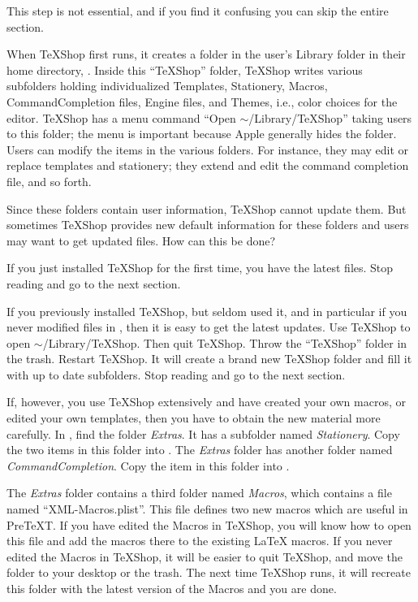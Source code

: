 \documentclass[11pt, oneside]{article}   	%
\begin{document}
 This step is not essential, and if you find it confusing you can  skip the entire section.
 
 When TeXShop first runs, it creates a folder in the user's Library folder in their home directory,  . Inside this ``TeXShop'' folder, TeXShop writes various subfolders  holding individualized  Templates, Stationery, Macros, CommandCompletion files, Engine files, and Themes, i.e., color choices for the editor. TeXShop has a menu command ``Open $\sim$/Library/TeXShop'' taking users to this folder; the menu is important because Apple generally hides the  folder. Users can modify the items in the various folders. For instance, they may edit or replace  templates and  stationery; 
 they extend and edit the command completion file, and so forth.

Since these folders contain user information, TeXShop cannot update them. But sometimes TeXShop provides new default information for these folders and users may want to get updated files.  How can this be done?

If you just installed TeXShop for the first time, you have the latest files. Stop reading and go to the next section.

If you previously installed TeXShop, but seldom used it, and in particular if you never modified files in , then it is easy to get the latest updates. Use TeXShop to open $\sim$/Library/TeXShop. Then quit TeXShop.
Throw the ``TeXShop'' folder in the trash. Restart TeXShop. It will create a brand new TeXShop folder and fill it with up to date subfolders. Stop reading and go to the next section.

If, however, you use TeXShop extensively and have created your own macros, or edited your own templates, then you have to obtain the new material more carefully. In , find the folder  {\em Extras}. It has a subfolder named {\em Stationery}.  Copy the two items in this folder into 
. The {\em Extras} folder has another folder named {\em CommandCompletion}. Copy the item in this folder into  . 

The {\em Extras} folder contains a third folder named {\em Macros}, which contains a file named ``XML-Macros.plist''. This file defines two new macros which are useful in PreTeXT. If you have edited the Macros in TeXShop, you will know how to open this file and  add the macros there to the existing LaTeX macros. If you never edited the Macros in TeXShop, it will be easier to quit TeXShop, and move the folder  to your desktop or the trash. The next time TeXShop runs, it will recreate this folder with the latest version of the Macros and you are done. 
\end{document}
